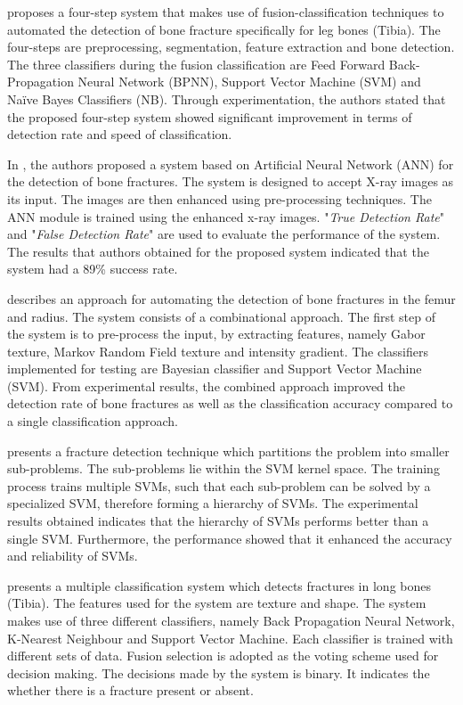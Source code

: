 \documentclass[11pt,twocolumn]{witseiepaper}
\begin{document}
	\cite{Mahendran_Enhanced} proposes a four-step system that makes use of fusion-classification techniques to automated the detection of bone fracture specifically for leg bones (Tibia). The four-steps are preprocessing, segmentation, feature extraction and bone detection. The three classifiers during the fusion classification are Feed Forward Back-Propagation Neural Network (BPNN), Support Vector Machine (SVM) and Na\"{i}ve Bayes Classifiers (NB). Through experimentation, the authors stated that the proposed four-step system showed significant improvement in terms of detection rate and speed of classification.
	
	In \cite{ComputerAidedBoneFractureDetection}, the authors proposed a system based on Artificial Neural Network (ANN) for the detection of bone fractures. The system is designed to accept X-ray images as its input. The images are then enhanced using pre-processing techniques. The ANN module is trained using the enhanced x-ray images. "\textit{True Detection Rate}" and "\textit{False Detection Rate}" are used to evaluate the performance of the system. The results that authors obtained for the proposed system indicated that the system had a 89\% success rate.
	
	\cite{lim2004detection} describes an approach for automating the detection of bone fractures in the femur and radius. The system consists of a combinational approach. The first step of the system is to pre-process the input, by extracting features, namely Gabor texture, Markov Random Field texture and intensity gradient. The classifiers implemented for testing are Bayesian classifier and Support Vector Machine (SVM). From experimental results, the combined approach improved the detection rate of bone fractures as well as the classification accuracy compared to a single classification approach.
	
	\cite{JoshuaCongfuHe2007} presents a fracture detection technique which partitions the problem into smaller sub-problems. The sub-problems lie within the SVM kernel space. The training process trains multiple SVMs, such that each sub-problem can be solved by a specialized SVM, therefore forming a hierarchy of SVMs. The experimental results obtained indicates that the hierarchy of SVMs performs better than a single SVM. Furthermore, the performance showed that it enhanced the accuracy and reliability of SVMs.
	
	\cite{multiple_classification} presents a multiple classification system which detects fractures in long bones (Tibia). The features used for the system are texture and shape. The system makes use of three different classifiers, namely Back Propagation Neural Network, K-Nearest Neighbour and Support Vector Machine. Each classifier is trained with different sets of data. Fusion selection is adopted as the voting scheme used for decision making. The decisions made by the system is binary. It indicates the whether there is a fracture present or absent.
	
\end{document}
